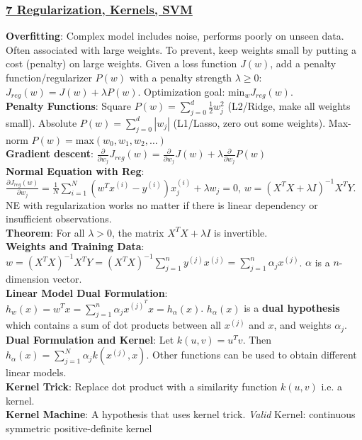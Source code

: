 \documentclass{article}
\begin{document}
{\begin{multicols*}{3}
\subsubsection*{\underline{7 Regularization, Kernels, SVM}}
\textbf{Overfitting}: Complex model includes noise, performs poorly on unseen data. Often associated with large weights. To prevent, keep weights small by putting a cost (penalty) on large weights. Given a loss function $J(w)$, add a penalty function/regularizer $P(w)$ with a penalty strength $\lambda\geq0$: $J_{reg}(w)=J(w)+\lambda P(w)$. Optimization goal: $\text{min}_wJ_{reg}(w)$. \\
\textbf{Penalty Functions}: Square $P(w)=\sum^d_{j=0}\frac{1}{2}w_j^2$ (L2/Ridge, make all weights small). Absolute $P(w)=\sum^d_{j=0}|w_j|$ (L1/Lasso, zero out some weights). Max-norm $P(w)=\text{max}(w_0,w_1,w_2,\dots)$\\
\textbf{Gradient descent}: $\frac{\partial}{\partial w_j}J_{reg}(w)=\frac{\partial}{\partial w_j}J(w)+\lambda \frac{\partial}{\partial w_j}P(w)$\\
\textbf{Normal Equation with Reg}: $\frac{\partial J_{reg}(w)}{\partial w_j}=\frac{1}{N}\sum^N_{i=1}(w^Tx^{(i)}-y^{(i)})x_j^{(i)}+\lambda w_j=0$, $w=(X^TX+\lambda I)^{-1}X^TY$. NE with regularization works no matter if there is linear dependency or insufficient observations. \\
\textbf{Theorem}: For all $\lambda>0$, the matrix $X^TX+\lambda I$ is invertible.\\
\textbf{Weights and Training Data}: $w=(X^TX)^{-1}X^TY=(X^TX)^{-1}\sum^n_{j=1}y^{(j)}x^{(j)}=\sum^n_{j=1}\alpha_jx^{(j)}$. $\alpha$ is a $n$-dimension vector. \\
\textbf{Linear Model Dual Formulation}: $h_w(x)=w^Tx=\sum^n_{j=1}\alpha_jx^{(j)^T}x=h_\alpha(x)$. $h_\alpha(x)$ is a \textbf{dual hypothesis} which contains a sum of dot products between all $x^{(j)}$ and $x$, and weights $\alpha_j$. \\
\textbf{Dual Formulation and Kernel}: Let $k(u,v)=u^Tv$. Then $h_\alpha(x)=\sum^N_{j=1}\alpha_jk(x^{(j)},x)$. Other functions can be used to obtain different linear models.\\
\textbf{Kernel Trick}: Replace dot product with a similarity function $k(u,v)$ i.e. a kernel. \\
\textbf{Kernel Machine}: A hypothesis that uses kernel trick. \textit{Valid} Kernel: continuous symmetric positive-definite kernel \\

\end{multicols*}}
\end{document}
